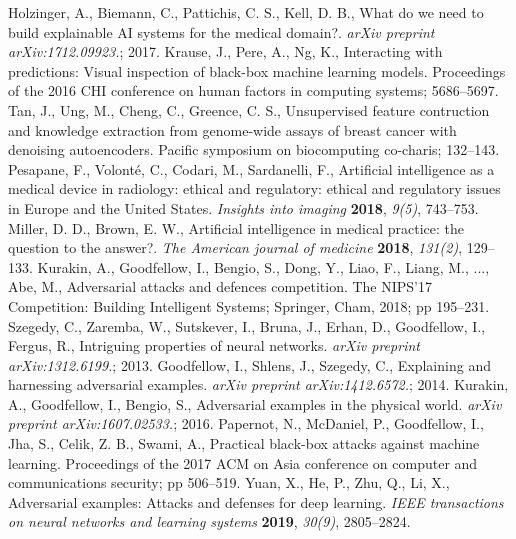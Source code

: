 \documentclass[symmetry,article,submit,moreauthors,pdftex]{Definitions/mdpi}
\begin{document}
\begin{thebibliography}{999}
Holzinger, A., Biemann, C., Pattichis, C. S., Kell, D. B., What do we need to build explainable AI systems for the medical domain?. \textit{arXiv preprint arXiv:1712.09923.}; 2017.
Krause, J., Pere, A., Ng, K., Interacting with predictions: Visual inspection of black-box machine learning models. Proceedings of the 2016 CHI conference on human factors in computing systems; 5686--5697.
Tan, J., Ung, M., Cheng, C., Greence, C. S., Unsupervised feature contruction and knowledge extraction from genome-wide assays of breast cancer with denoising autoencoders. Pacific symposium on biocomputing co-charis; 132--143.
Pesapane, F., Volonté, C., Codari, M., Sardanelli, F., Artificial intelligence as a medical device in radiology: ethical and regulatory: ethical and regulatory issues in Europe and the United States. {\em Insights into imaging} {\bf 2018}, {\em 9(5)}, 743--753.
Miller, D. D., Brown, E. W., Artificial intelligence in medical practice: the question to the answer?. {\em The American journal of medicine} {\bf 2018}, {\em 131(2)}, 129--133.
Kurakin, A., Goodfellow, I., Bengio, S., Dong, Y., Liao, F., Liang, M., ..., Abe, M., Adversarial attacks and defences competition. The NIPS'17 Competition: Building Intelligent Systems; Springer, Cham, 2018; pp 195--231.
Szegedy, C., Zaremba, W., Sutskever, I., Bruna, J., Erhan, D., Goodfellow, I., Fergus, R., Intriguing properties of neural networks. \textit{arXiv preprint arXiv:1312.6199.}; 2013.
Goodfellow, I., Shlens, J., Szegedy, C., Explaining and harnessing adversarial examples. \textit{arXiv preprint arXiv:1412.6572.}; 2014.
Kurakin, A., Goodfellow, I., Bengio, S., Adversarial examples in the physical world. \textit{arXiv preprint arXiv:1607.02533.}; 2016.
Papernot, N., McDaniel, P., Goodfellow, I., Jha, S., Celik, Z. B., Swami, A., Practical black-box attacks against machine learning. Proceedings of the 2017 ACM on Asia conference on computer and communications security; pp 506--519.
Yuan, X., He, P., Zhu, Q., Li, X., Adversarial examples: Attacks and defenses for deep learning. {\em IEEE transactions on neural networks and learning systems} {\bf 2019}, {\em 30(9)}, 2805--2824.

\end{thebibliography}
\end{document}
